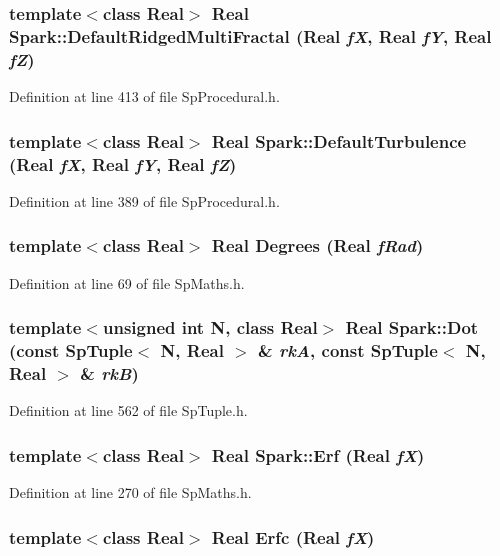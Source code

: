 \subsubsection{\setlength{\rightskip}{0pt plus 5cm}template$<$class Real$>$ Real Spark::Default\-Ridged\-Multi\-Fractal (Real {\em f\-X}, Real {\em f\-Y}, Real {\em f\-Z})}\label{namespaceSpark_a89}


Definition at line 413 of file Sp\-Procedural.h.
\subsubsection{\setlength{\rightskip}{0pt plus 5cm}template$<$class Real$>$ Real Spark::Default\-Turbulence (Real {\em f\-X}, Real {\em f\-Y}, Real {\em f\-Z})}\label{namespaceSpark_a85}


Definition at line 389 of file Sp\-Procedural.h.
\subsubsection{\setlength{\rightskip}{0pt plus 5cm}template$<$class Real$>$ Real Degrees (Real {\em f\-Rad})}\label{namespaceSpark_a39}


Definition at line 69 of file Sp\-Maths.h.
\subsubsection{\setlength{\rightskip}{0pt plus 5cm}template$<$unsigned int N, class Real$>$ Real Spark::Dot (const Sp\-Tuple$<$ N, Real $>$ \& {\em rk\-A}, const Sp\-Tuple$<$ N, Real $>$ \& {\em rk\-B})}\label{namespaceSpark_a121}


Definition at line 562 of file Sp\-Tuple.h.
\subsubsection{\setlength{\rightskip}{0pt plus 5cm}template$<$class Real$>$ Real Spark::Erf (Real {\em f\-X})}\label{namespaceSpark_a60}


Definition at line 270 of file Sp\-Maths.h.
\subsubsection{\setlength{\rightskip}{0pt plus 5cm}template$<$class Real$>$ Real Erfc (Real {\em f\-X})}\label{namespaceSpark_a36}


